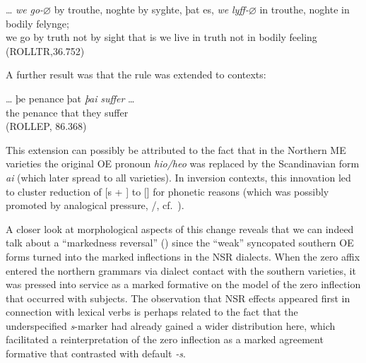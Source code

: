 \documentclass[output=paper]{langsci/langscibook}
\begin{document}
\ea
\gll \ldots{} \textit{we} \textit{go{-$\varnothing$}} by trouthe, noghte by syghte, þat es, \textit{we} \textit{lyff{-$\varnothing$}} in trouthe, noghte in bodily felynge;\\
{} we go by truth not by sight that is we live in truth not in bodily feeling\\
\glt (ROLLTR,36.752)
\z

\noindent
A further result was that the rule was extended to \Tpl{} contexts:

\ea
\gll \ldots{}  þe   penance    þat    \textit{þai} \textit{suffer} \ldots{}\\
{} the  penance  that  they  suffer {}\\
\glt (ROLLEP, 86.368)

\z

This extension can possibly be attributed to the fact that in the Northern ME
varieties the original \gls{OE} \Tpl{} pronoun \emph{hio/heo} was replaced by the
Scandinavian form \emph{\dh{}ai} (which later spread to all varieties). In
inversion contexts, this innovation led to cluster reduction of [s + \dh{}] to
[\dh{}] for phonetic reasons (which was possibly promoted by analogical
pressure, \Fpl{}/\Spl{}, cf.\ \citealt[56]{Pietsch:2005a}).

A closer look at morphological aspects of this change reveals that we can
indeed talk about a ``markedness reversal'' (\citealt{Pietsch:2005a}) since the
``weak'' syncopated southern \gls{OE} forms turned into the marked inflections in
the \gls{NSR} dialects. When the zero affix entered the northern grammars via
dialect contact with the southern varieties, it was pressed into service as a
marked  formative on the model of the zero inflection that occurred
with \Fsg{} subjects.  The observation that \gls{NSR} effects appeared first in
connection with lexical verbs is perhaps related to the fact that the
underspecified \emph{s}-marker had already gained a wider distribution here,
which facilitated a reinterpretation of the zero inflection as a marked
agreement formative that contrasted with default \emph{-s}.
\end{document}
